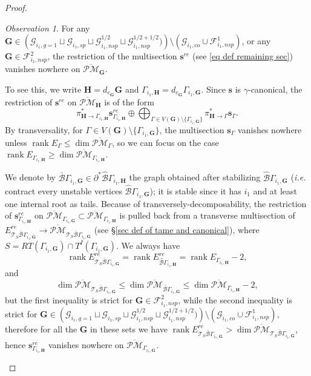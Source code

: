 \documentclass[11pt]{amsart}
\theoremstyle{definition}
\theoremstyle{remark}
\newtheorem{obs}[dummy]{Observation}
\newcommand{\oPMb}{{\overline{\mathcal{PM}}}}
\newcommand{\<}{\left<}
\renewcommand{\>}{\right>}
\numberwithin{equation}{section}
\DeclareMathOperator{\rk}{rank}
\begin{document}
\begin{proof}
        \begin{obs}\label{obs zero locus of modified canonical}
            For any $\bm{G}\in \left(\bm{\mathcal G}^{}_{i_1,g=1} \sqcup \bm{\mathcal G}^{}_{i_1,sp} \sqcup \bm{\mathcal G}^{1/2}_{i_1,nsp} \sqcup \bm{\mathcal G}^{1/2+1/2}_{i_1,nsp})\right)\setminus (\bm{\mathcal G}_{i_1,co}\cup \bm{\mathcal F}^1_{i_1,nsp})$, or any $\bm{G}\in \bm{\mathcal F}^2_{i_1,nsp}$, the restriction of the multisection $\bm{s}^{re}$ (see \eqref{eq def remaining sec}) vanishes nowhere on $\oPMb_{\bm{G}}$. 
            
            To see this, we  write $\bm{H}=d_{e_{\bm{G}}}\bm{G}$ and  $\Gamma_{i_1,\bm{H}}=d_{e_{\bm{G}}}\Gamma_{i_1,\bm{G}}$. Since $\bm{s}$ is $\gamma$-canonical, the restriction of  $\bm{s}^{re}$ on $\oPMb_{\bm{H}}$ is of the form
            $$\pi^*_{\bm{H}\to \Gamma_{i_1,\bm{H}}} \bm{s}^{re}_{\Gamma_{i_1,\bm{H}}}\oplus\bigoplus_{\Gamma \in V(\bm{G})\setminus\{\Gamma_{i_1,\bm{G}}\}} \pi^*_{\bm{H} \to \Gamma} \bm{s}_{\Gamma}.$$
            By transversality, for $\Gamma\in V(\bm{G})\setminus \{\Gamma_{i_1,\bm{G}}\}$,  the multisection $\bm{s}_{\Gamma}$ vanishes nowhere unless $\rk E_{\Gamma}\le \dim \oPMb_{\Gamma}$, so we can focus on the case $\rk E_{\Gamma_{i_1,\bm{H}}}\ge \dim \oPMb_{\Gamma_{i_1,\bm{H}}}$. 

            We denote by $\bar{\mathcal B}\Gamma_{i_1,\bm{G}}\in \partial^* \hat{\mathcal B}\Gamma_{i_1,\bm{H}}$ the graph obtained after stabilizing $\hat{\mathcal B}\Gamma_{i_1,\bm{G}}$ (\textit{i.e.} contract every unstable vertices $\hat{\mathcal B}\Gamma_{i_1,\bm{G}}$); it is stable since it has $i_1$ and at least one internal root as tails. Because of transversely-decomposability, the restriction of $\bm{s}^{re}_{ \Gamma_{i_1,\bm{H}}}$ on $\oPMb_{\Gamma_{i_1,\bm{G}}}\subset \oPMb_{\Gamma_{i_1,\bm{H}}}$ is pulled back from a transverse multisection of  $E^{re}_{\mathcal T_S \bar{\mathcal B}\Gamma_{i_1,\bm{G}}}\to \oPMb_{\mathcal T_S \bar{\mathcal B}\Gamma_{i_1,\bm{G}}}$ (see \S \ref{sec def of tame and canonical}), where  $S=RT(\Gamma_{i_1,\bm{G}})\cap T^I({\Gamma_{i_1,\bm{G}}})$. We always have 
            $$\rk E^{re}_{\mathcal T_S \bar{\mathcal B}\Gamma_{i_1,\bm{G}}}=\rk E^{re}_{\hat{\mathcal B}\Gamma_{i_1,\bm{H}}}=\rk E_{\Gamma_{i_1,\bm{H}}}-2,$$
            and 
            $$
            \dim \oPMb_{\mathcal T_S \bar{\mathcal B}\Gamma_{i_1,\bm{G}}}\le 
            \dim \oPMb_{ \bar{\mathcal B}\Gamma_{i_1,\bm{G}}} \le \dim \oPMb_{\Gamma_{i_1,\bm{H}}}-2,
            $$
            but the first inequality  is strict for $\bm{G}\in \bm{\mathcal F}^2_{i_1,nsp}$, while the second inequality is strict for $\bm{G}\in \left(\bm{\mathcal G}^{}_{i_1,g=1} \sqcup \bm{\mathcal G}^{}_{i_1,sp} \sqcup \bm{\mathcal G}^{1/2}_{i_1,nsp} \sqcup \bm{\mathcal G}^{1/2+1/2}_{i_1,nsp})\right)\setminus (\bm{\mathcal G}_{i_1,co}\cup \bm{\mathcal F}^1_{i_1,nsp})$,           therefore for all the $\bm{G}$ in these sets we have $\rk E^{re}_{\mathcal T_S \bar{\mathcal B}\Gamma_{i_1,\bm{G}}}> \dim \oPMb_{\mathcal T_S \bar{\mathcal B}\Gamma_{i_1,\bm{G}}}$, hence  $\bm{s}^{re}_{ \Gamma_{i_1,\bm{H}}}$ vanishes nowhere on $\oPMb_{ \Gamma_{i_1,\bm{G}}}$.
            

\end{obs}
\end{proof}
\end{document}
